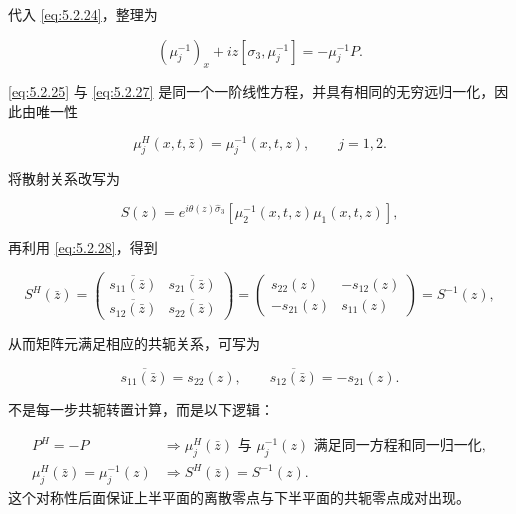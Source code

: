 \documentclass[
    lang=cn,
    scheme=chinese,
    mode=simple,
    device=normal,
    color=blue,
    math=cm,
    thmcnt=section,
    12pt
]{elegantbook}
\begin{document}
代入 \eqref{eq:5.2.24}，整理为

\begin{equation}
    (\mu_j^{-1})_x
    +
    iz[\sigma_3,\mu_j^{-1}]
    =
    -\mu_j^{-1}P.
    \tag{5.2.27}
    \label{eq:5.2.27}
\end{equation}

\eqref{eq:5.2.25} 与 \eqref{eq:5.2.27} 是同一个一阶线性方程，并具有相同的无穷远归一化，因此由唯一性

\begin{equation}
    \mu_j^H(x,t,\bar z)
    =
    \mu_j^{-1}(x,t,z),
    \qquad j=1,2.
    \tag{5.2.28}
    \label{eq:5.2.28}
\end{equation}

将散射关系改写为

\begin{equation}
    S(z)
    =
    e^{i\theta(z)\widehat{\sigma}_3}
    \left[\mu_2^{-1}(x,t,z)\mu_1(x,t,z)\right],
    \tag{5.2.29}
    \label{eq:5.2.29}
\end{equation}

再利用 \eqref{eq:5.2.28}，得到

\[
    S^H(\bar z)
    =
    \begin{pmatrix}
        \overline{s_{11}(\bar z)} & \overline{s_{21}(\bar z)} \\
        \overline{s_{12}(\bar z)} & \overline{s_{22}(\bar z)}
    \end{pmatrix}
    =
    \begin{pmatrix}
        s_{22}(z)  & -s_{12}(z) \\
        -s_{21}(z) & s_{11}(z)
    \end{pmatrix}
    =
    S^{-1}(z),
\]

从而矩阵元满足相应的共轭关系，可写为

\begin{equation}
    \overline{s_{11}(\bar z)}=s_{22}(z),
    \qquad
    \overline{s_{12}(\bar z)}=-s_{21}(z).
    \tag{5.2.30}
    \label{eq:5.2.30}
\end{equation}

\begin{callout}[2.2 节真正要记住什么？]
    不是每一步共轭转置计算，而是以下逻辑：

    \[
        \begin{aligned}
            P^H=-P
             & \Longrightarrow
            \mu_j^H(\bar z)\text{ 与 }\mu_j^{-1}(z)
            \text{ 满足同一方程和同一归一化},
            \\
            \mu_j^H(\bar z)=\mu_j^{-1}(z)
             & \Longrightarrow
            S^H(\bar z)=S^{-1}(z).
        \end{aligned}
    \]
    这个对称性后面保证上半平面的离散零点与下半平面的共轭零点成对出现。
\end{callout}
\end{document}
